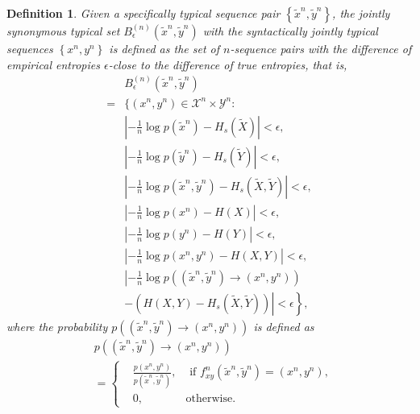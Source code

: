 \documentclass[12pt, draftclsnofoot,onecolumn]{IEEEtran}
\newtheorem{definition}{\bf{Definition}}
\begin{document}
\begin{definition}
Given a specifically typical sequence pair $\left\{\tilde{x}^n,\tilde{y}^n\right\}$, the jointly synonymous typical set $B_{\epsilon}^{(n)}\left(\tilde{x}^n,\tilde{y}^n\right)$ with the syntactically jointly typical sequences $\left\{x^n,y^n\right\}$ is defined as the set of $n$-sequence pairs with the difference of empirical entropies $\epsilon$-close to the difference of true entropies, that is,
\begin{equation}
\begin{aligned}
&B_{\epsilon}^{(n)}\left(\tilde{x}^n,\tilde{y}^n\right)\\
=&\bigg\{\left(x^n,y^n\right) \in {\mathcal{X}}^n\times \mathcal{Y}^n:  \\
                                                              &\left|-\frac{1}{n}\log p\left(\tilde{x}^n \right)-H_s(\tilde{X})\right|<\epsilon,\\
                                                              &\left|-\frac{1}{n}\log p\left(\tilde{y}^n \right)-H_s(\tilde{Y})\right|<\epsilon, \\
                                                              &\left|-\frac{1}{n}\log p\left(\tilde{x}^n,\tilde{y}^n\right)-H_s(\tilde{X},\tilde{Y})\right|<\epsilon,\\
                                                              &\left|-\frac{1}{n}\log p\left(x^n \right)-H(X)\right|<\epsilon,\\
                                                              &\left|-\frac{1}{n}\log p\left(y^n \right)-H(Y)\right|<\epsilon, \\
                                                              &\left|-\frac{1}{n}\log p\left(x^n,y^n\right)-H(X,Y)\right|<\epsilon,\\
&\left|-\frac{1}{n}\log p((\tilde{x}^n,\tilde{y}^n)\to (x^n,y^n))\right.\\
&\left.\left.-\left(H(X,Y)-H_s(\tilde{X},\tilde{Y})\right)\right|<\epsilon\right\},
\end{aligned}
\end{equation}
where the probability $p((\tilde{x}^n,\tilde{y}^n)\to (x^n,y^n))$ is defined as
\begin{equation}
\begin{aligned}
&p((\tilde{x}^n,\tilde{y}^n)\to (x^n,y^n))\\
&=\left\{
\begin{aligned}
&\frac{p\left(x^n,y^n\right)}{p\left(\tilde{x}^n,\tilde{y}^n\right)},&\text{ if } f_{xy}^n(\tilde{x}^n,\tilde{y}^n)=(x^n,y^n),\\
&0,&\text{otherwise}.
\end{aligned}\right.
\end{aligned}
\end{equation}
\end{definition}
\end{document}
